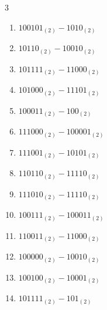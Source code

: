 \begin{multicols}{3}
\begin{enumerate}
  \item $100101_{(2)} - 1010_{(2)}$


  \item $10110_{(2)} - 10010_{(2)}$


  \item $101111_{(2)} - 11000_{(2)}$


  \item $101000_{(2)} - 11101_{(2)}$


  \item $100011_{(2)} - 100_{(2)}$


  \item $111000_{(2)} - 100001_{(2)}$


  \item $111001_{(2)} - 10101_{(2)}$


\columnbreak %

  \item $110110_{(2)} - 11110_{(2)}$


  \item $111010_{(2)} - 11110_{(2)}$


  \item $100111_{(2)} - 100011_{(2)}$


  \item $110011_{(2)} - 11000_{(2)}$


  \item $100000_{(2)} - 10010_{(2)}$


  \item $100100_{(2)} - 10001_{(2)}$


  \item $101111_{(2)} - 101_{(2)}$


\end{enumerate}
\end{multicols}
